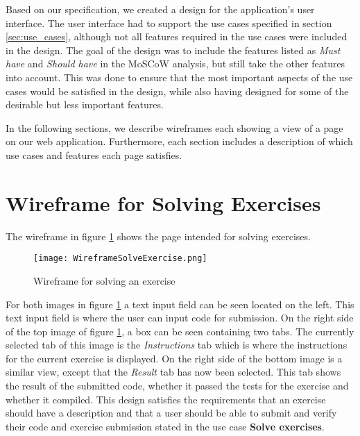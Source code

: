 Based on our specification, we created a design for the application's user interface. The user interface had to support the use cases specified in section \ref*{sec:use_cases}, although not all features required in the use cases were included in the design. The goal of the design was to include the features listed as \textit{Must have} and \textit{Should have} in the MoSCoW analysis, but still take the other features into account. This was done to ensure that the most important aspects of the use cases would be satisfied in the design, while also having designed for some of the desirable but less important features.

In the following sections, we describe wireframes each showing a view of a page on our web application. Furthermore, each section includes a description of which use cases and features each page satisfies.

\section{Wireframe for Solving Exercises}
The wireframe in figure \ref{fig:wfExercise} shows the page intended for solving exercises.
\begin{figure}[H]
	\texttt{[image: WireframeSolveExercise.png]}
	\centering
	\caption{Wireframe for solving an exercise}
	\label{fig:wfExercise}
\end{figure}

For both images in figure \ref{fig:wfExercise} a text input field can be seen located on the left. This text input field is where the user can input code for submission. On the right side of the top image of figure \ref{fig:wfExercise}, a box can be seen containing two tabs. The currently selected tab of this image is the \textit{Instructions} tab which is where the instructions for the current exercise is displayed. On the right side of the bottom image is a similar view, except that the \textit{Result} tab has now been selected. This tab shows the result of the submitted code, whether it passed the tests for the exercise and whether it compiled. This design satisfies the requirements that an exercise should have a description and that a user should be able to submit and verify their code and exercise submission stated in the use case \textbf{Solve exercises}.

